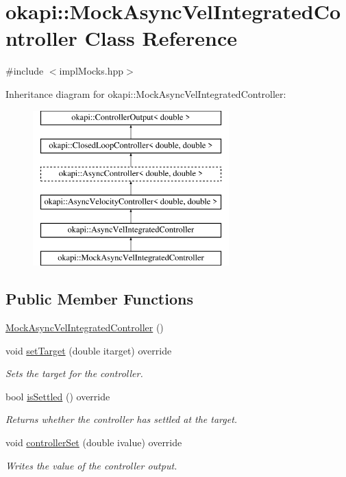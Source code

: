\hypertarget{classokapi_1_1MockAsyncVelIntegratedController}{}\section{okapi\+::Mock\+Async\+Vel\+Integrated\+Controller Class Reference}
\label{classokapi_1_1MockAsyncVelIntegratedController}


{\ttfamily \#include $<$impl\+Mocks.\+hpp$>$}

Inheritance diagram for okapi\+::Mock\+Async\+Vel\+Integrated\+Controller\+:\begin{figure}[H]
\begin{center}
\leavevmode
\includegraphics[height=6.000000cm]{classokapi_1_1MockAsyncVelIntegratedController}
\end{center}
\end{figure}
\subsection*{Public Member Functions}
\begin{DoxyCompactItemize}
\item 
\mbox{\hyperlink{classokapi_1_1MockAsyncVelIntegratedController_a3f8369a777935bd0ee078e1683856a71}{Mock\+Async\+Vel\+Integrated\+Controller}} ()
\item 
void \mbox{\hyperlink{classokapi_1_1MockAsyncVelIntegratedController_a9013a295a5a5fca3bbf831932c16f90a}{set\+Target}} (double itarget) override
\begin{DoxyCompactList}\small\item\em Sets the target for the controller. \end{DoxyCompactList}\item 
bool \mbox{\hyperlink{classokapi_1_1MockAsyncVelIntegratedController_a2f33eb51499bbc158d9d604f4c568b4f}{is\+Settled}} () override
\begin{DoxyCompactList}\small\item\em Returns whether the controller has settled at the target. \end{DoxyCompactList}\item 
void \mbox{\hyperlink{classokapi_1_1MockAsyncVelIntegratedController_a7992b27e427fd6340a50af32ffca7854}{controller\+Set}} (double ivalue) override
\begin{DoxyCompactList}\small\item\em Writes the value of the controller output. \end{DoxyCompactList}\end{DoxyCompactItemize}
